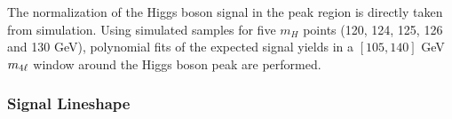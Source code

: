 The normalization of the Higgs boson signal in the peak region is directly taken from simulation. Using simulated samples for five $m_H$ points (120, 124, 125, 126 and 130 GeV), polynomial fits of the expected signal yields in a $[105, 140]$ GeV $m_{4\ell}$ window around the Higgs boson peak are performed.


\clearpage

\subsubsection{Signal Lineshape}
\label{sec:signalshapes}

